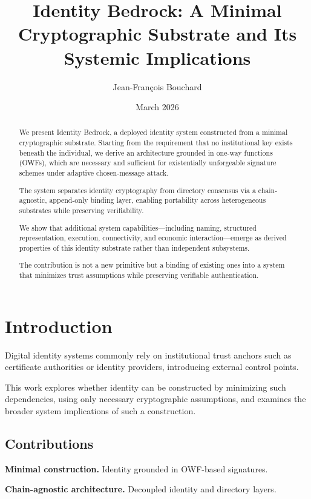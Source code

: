 \documentclass[11pt,a4paper]{article}
\title{\textbf{Identity Bedrock: A Minimal Cryptographic Substrate and Its Systemic Implications}}
\author{Jean-François Bouchard}
\date{March 2026}
\begin{document}
\maketitle

\begin{abstract}
We present Identity Bedrock, a deployed identity system constructed from a minimal cryptographic substrate. Starting from the requirement that no institutional key exists beneath the individual, we derive an architecture grounded in one-way functions (OWFs), which are necessary and sufficient for existentially unforgeable signature schemes under adaptive chosen-message attack.

The system separates identity cryptography from directory consensus via a chain-agnostic, append-only binding layer, enabling portability across heterogeneous substrates while preserving verifiability.

We show that additional system capabilities---including naming, structured representation, execution, connectivity, and economic interaction---emerge as derived properties of this identity substrate rather than independent subsystems.

The contribution is not a new primitive but a binding of existing ones into a system that minimizes trust assumptions while preserving verifiable authentication.
\end{abstract}

\section{Introduction}

Digital identity systems commonly rely on institutional trust anchors such as certificate authorities or identity providers, introducing external control points.

This work explores whether identity can be constructed by minimizing such dependencies, using only necessary cryptographic assumptions, and examines the broader system implications of such a construction.

\subsection{Contributions}

\textbf{Minimal construction.} Identity grounded in OWF-based signatures.

\textbf{Chain-agnostic architecture.} Decoupled identity and directory layers.
\end{document}
